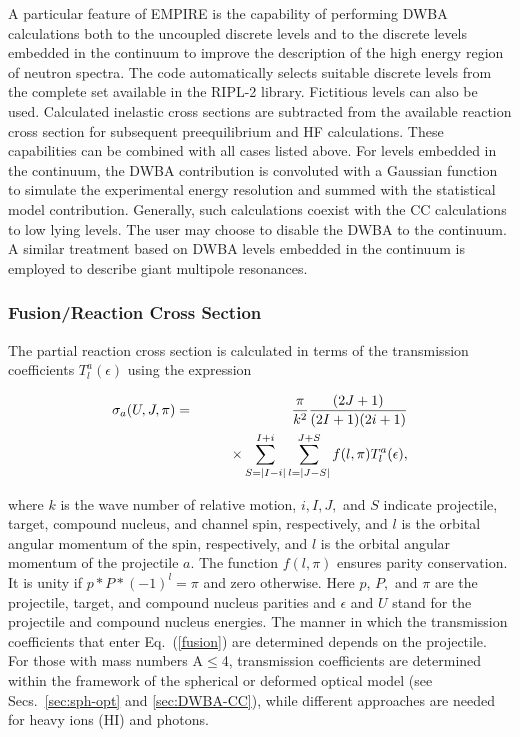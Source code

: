 \bigskip

A particular feature of EMPIRE is the capability of performing DWBA
calculations both to the uncoupled discrete levels and to the discrete levels
embedded in the continuum to improve the description of the high energy
region of neutron spectra. The code automatically selects suitable discrete
levels from the complete set available in the RIPL-2 library. Fictitious
levels can also be used. Calculated inelastic cross sections are
subtracted from the available reaction cross section for subsequent
preequilibrium and HF calculations. These capabilities can be combined with
all cases listed above. For levels embedded in the continuum, the
DWBA contribution is convoluted with a Gaussian function to simulate the
experimental energy resolution and summed with the statistical model
contribution. Generally, such calculations coexist with the CC calculations
to low lying levels. The user may choose to disable the DWBA to the
continuum. A similar treatment based on DWBA levels embedded in the
continuum is employed to describe giant multipole resonances.

\subsubsection{Fusion/Reaction Cross Section\label{sec:fusion}}

The partial reaction cross section is calculated in terms of the transmission
coefficients $T_{l}^{a}(\epsilon)$ using the expression

\begin{eqnarray}
\sigma_{a}(U,J,\pi) & = &
\frac{\pi}{k^{2}}\frac{(2J+1)}{(2I+1)(2i+1)}  \label{fusion} \\
& & \qquad\times
\sum_{S=|I-i|}^{I+i}\sum_{l=|J-S|}^{J+S}f(l,\pi)T_{l}^{a}(\epsilon),  \notag
\end{eqnarray}

\noindent where $k$ is the wave number of relative motion, $i,I,J,$ and $S$
indicate projectile, target, compound nucleus, and channel spin,
respectively, and $l$ is the orbital angular momentum of the spin,
respectively, and $l$ is the orbital angular momentum of the projectile $a$.
The function $f(l,\pi)$ ensures parity conservation. It is unity if $%
p*P*(-1)^{l}=\pi$ and zero otherwise. Here $p,\, P,$ and $\pi$ are the
projectile, target, and compound nucleus parities and $\epsilon$ and $U$
stand for the projectile and compound nucleus energies. The manner in which the
transmission coefficients that enter Eq.~(\ref{fusion}) are determined depends
on the projectile. For those with mass numbers A$\leq$4, transmission
coefficients are determined within the framework of the spherical or
deformed optical model (see Secs.~\ref{sec:sph-opt} and \ref{sec:DWBA-CC}),
while different approaches are needed for heavy ions (HI) and photons.

